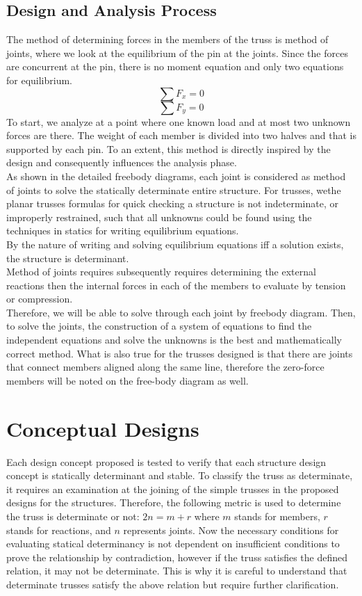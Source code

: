 \section{Design and Analysis Process}
The method of determining forces in the members of the truss is method of joints, where we look at the equilibrium of the pin at the joints. Since the forces are concurrent at the pin, there is no moment equation and only two equations for equilibrium.
$$ \sum F_{x} = 0$$
$$\sum F_{y} = 0 $$
To start, we analyze at a point where one known load and at most two unknown forces are there. The weight of each member is divided into two halves and that is supported by each pin. To an extent, this method is directly inspired by the design and consequently influences the analysis phase. \\
As shown in the detailed freebody diagrams, each joint is considered as method of joints to solve the statically determinate entire structure. For trusses, wethe planar trusses formulas for quick checking a structure is not indeterminate, or improperly restrained, such that all unknowns could be found using the techniques in statics for writing equilibrium equations. \\
By the nature of writing and solving equilibrium equations iff a solution exists, the structure is determinant.\\
Method of joints requires subsequently requires determining the external reactions then the internal forces in each of the members to evaluate by tension or compression.\\
Therefore, we will be able to solve through each joint by freebody diagram. Then, to solve the joints, the construction of a system of equations to find the independent equations and solve the unknowns is the best and mathematically correct method. What is also true for the trusses designed is that there are joints that connect members aligned along the same line, therefore the zero-force members will be noted on the free-body diagram as well. \\
\chapter{Conceptual Designs}
Each design concept proposed is tested to verify that each structure design concept is statically determinant and stable. To classify the truss as determinate, it requires an examination at the joining of the simple trusses in the proposed designs for the structures. Therefore, the following metric is used to determine the truss is determinate or not: $2n = m + r$ where $m$ stands for members, $r$ stands for reactions, and $n$ represents joints. Now the necessary conditions for evaluating statical determinancy is not dependent on insufficient conditions to prove the relationship by contradiction, however if the truss satisfies the defined relation, it may not be determinate. This is why it is careful to understand that determinate trusses satisfy the above relation but require further clarification. 
